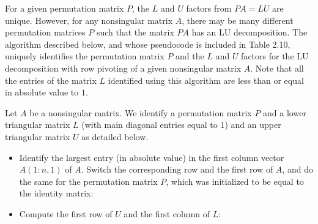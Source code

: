 For a given permutation matrix $P$, the $L$ and $U$ factors from $PA=LU$ are
unique. However, for any nonsingular matrix $A$, there may be many different
permutation matrices $P$ such that the matrix $PA$ has an LU decomposition. The
algorithm described below, and whose pseudocode is included in Table 2.10,
uniquely identifies the permutation matrix $P$ and the $L$ and $U$ factors for the
LU decomposition with row pivoting of a given nonsingular matrix $A$. Note that all
the entries of the matrix $L$ identified using this algorithm are less than or
equal in absolute value to $1$.

Let $A$ be a nonsingular matrix. We identify a permutation matrix $P$ and a lower
triangular matrix $L$ (with main diagonal entries equal to $1$) and an upper
triangular matrix $U$ as detailed below.

\begin{itemize}
\item Identify the largest entry (in absolute value) in the first column vector
$A(1:n,1)$ of $A$. Switch the corresponding row and the first row of $A$, and do
the same for the permutation matrix $P$, which was initialized to be equal to the
identity matrix:
\end{itemize}

\begin{center}
\end{center}

\begin{itemize}
\item Compute the first row of $U$ and the first column of $L$:
\end{itemize}

\begin{center}
\end{center}

